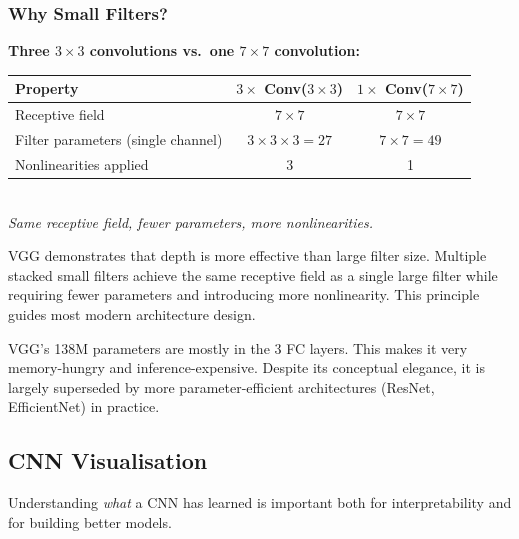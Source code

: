 \documentclass[11pt,a4paper]{article}
\begin{document}
\subsubsection{Why Small Filters?}

\begin{tcolorbox}[colback=LightBlue,colframe=AccentBlue,boxrule=0.8pt,arc=3pt]
\textbf{Three $3\times3$ convolutions vs.\ one $7\times7$ convolution:}\\[4pt]
\begin{tabular}{@{}lcc@{}}
\toprule
\textbf{Property} & \textbf{$3\times$ Conv($3\times3$)} & \textbf{$1\times$ Conv($7\times7$)} \\
\midrule
Receptive field & $7\times7$ & $7\times7$ \\
Filter parameters (single channel) & $3\times3\times3 = 27$ & $7\times7 = 49$ \\
Nonlinearities applied & 3 & 1 \\
\bottomrule
\end{tabular}\\[6pt]
\textit{Same receptive field, fewer parameters, more nonlinearities.}
\end{tcolorbox}

\begin{insightbox}
VGG demonstrates that depth is more effective than large filter size. Multiple stacked small filters achieve the same receptive field as a single large filter while requiring fewer parameters and introducing more nonlinearity. This principle guides most modern architecture design.
\end{insightbox}

\begin{warnbox}
VGG's 138M parameters are mostly in the 3 FC layers. This makes it very memory-hungry and inference-expensive. Despite its conceptual elegance, it is largely superseded by more parameter-efficient architectures (ResNet, EfficientNet) in practice.
\end{warnbox}

\subsection{CNN Visualisation}
\label{sec:cnn_viz}

Understanding \emph{what} a CNN has learned is important both for interpretability and for building better models.
\end{document}
